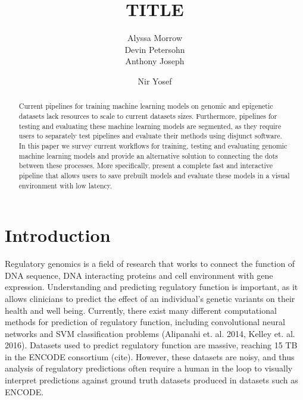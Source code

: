 \documentclass{sig-alternate-05-2015}
\begin{document}


\title{TITLE}



\author{
\alignauthor
Alyssa Morrow \\
\alignauthor
Devin Petersohn \\
\alignauthor Anthony Joseph \\
\and  %
\alignauthor Nir Yosef \\
}

\maketitle
\begin{abstract}
Current pipelines for training machine learning models on genomic and epigenetic datasets lack resources to scale to current datasets sizes. Furthermore, pipelines for testing and evaluating these machine learning models are segmented, as they require users to separately test pipelines and evaluate their methods using disjunct software. In this paper we survey current workflows for training, testing and evaluating genomic machine learning models and provide an alternative solution to connecting the dots between these processes. More specifically, present a complete fast and interactive pipeline that allows users to save prebuilt models and evaluate these models in a visual environment with low latency.
\end{abstract}


\printccsdesc


\section{Introduction}
Regulatory genomics is a field of research that works to connect the function of DNA sequence, DNA interacting proteins and cell environment with gene expression. Understanding and predicting regulatory function is important, as it allows clinicians to predict the effect of an individual's genetic variants on their health and well being. Currently, there exist many different computational methods for prediction of regulatory function, including convolutional neural networks and SVM classification problems (Alipanahi et. al. 2014, Kelley et. al. 2016).  Datasets used to predict regulatory function are massive, reaching 15 TB in the ENCODE consortium (cite). However, these datasets are noisy, and thus analysis of regulatory predictions often require a human in the loop to visually interpret predictions against ground truth datasets produced in datasets such as ENCODE. \\
\end{document}
